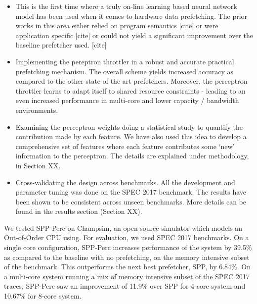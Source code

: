 \documentclass{sig-alternate}
\begin{document}
\begin{itemize}
\item This is the first time where a truly on-line learning based neural network model has been used when it comes to hardware data prefetching. 
The prior works in this area either relied on program semantics [cite] or were application specific [cite] or could not yield a significant improvement over the baseline prefetcher used. [cite]

\item Implementing the pereptron throttler in a robust and accurate practical prefetching mechanism. 
The overall scheme yields increased accuracy as compared to the other state of the art prefetchers.
Moreover, the perceptron throttler learns to adapt itself to shared resource constraints - leading to an even increased performance in multi-core and lower capacity / bandwidth environments. 

\item Examining the perceptron weights doing a statistical study to quantify the contribution made by each feature.
We have also used this idea to develop a comprehensive set of features where each feature contributes some `new' information to the perceptron.
The details are explained under methodology, in Section XX.

\item Cross-validating the design across benchmarks. 
All the development and parameter tuning was done on the SPEC 2017 benchmark. 
The results have been shown to be consistent across unseen benchmarks.
More details can be found in the results section (Section XX).



\end{itemize}

We tested SPP-Perc on Champsim, an open source simulator which models an Out-of-Order CPU using. 
For evaluation, we used SPEC 2017 benchmarks. 
On a single core configuration, SPP-Perc increases performance of the system by 39.5\% as compared to the baseline with no prefetching, on the memory intensive subset of the benchmark.
This outperforms the next best prefetcher, SPP,  by 6.84\%. 
On a multi-core system running a mix of memory intensive subset of the SPEC 2017 traces, SPP-Perc saw an improvement of 11.9\% over SPP for 4-core system and 10.67\% for 8-core system.
\end{document}
